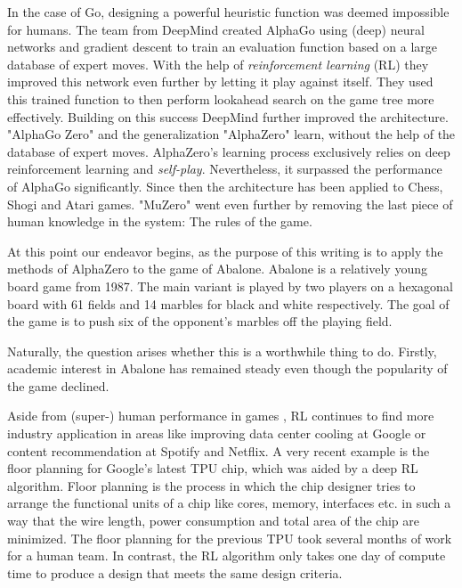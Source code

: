 In the case of Go, designing a powerful heuristic function was deemed impossible for humans. The team from DeepMind created AlphaGo using (deep) neural networks and gradient descent to train an evaluation function based on a large database of expert moves. With the help of \textit{reinforcement learning} (RL) they improved this network even further by letting it play against itself. They used this trained function to then perform lookahead search on the game tree more effectively. \cite{silver_mastering_2017} Building on this success DeepMind further improved the architecture. "AlphaGo Zero" and the generalization "AlphaZero" learn, without the help of the database of expert moves. AlphaZero's learning process exclusively relies on deep reinforcement learning and \textit{self-play}. Nevertheless, it surpassed the performance of AlphaGo significantly. Since then the architecture has been applied to Chess, Shogi and Atari games. "MuZero" went even further by removing the last piece of human knowledge in the system: The rules of the game. \cite{schrittwieser_mastering_2020}

At this point our endeavor begins, as the purpose of this writing is to apply the methods of AlphaZero to the game of Abalone. Abalone is a relatively young board game from 1987. The main variant is played by two players on a hexagonal board with 61 fields and 14 marbles for black and white respectively. The goal of the game is to push six of the opponent's marbles off the playing field.

Naturally, the question arises whether this is a worthwhile thing to do. Firstly, academic interest in Abalone has remained steady even though the popularity of the game declined.

Aside from (super-) human performance in games \cite{mnih_human-level_2015, berner_dota_2019,vinyals_grandmaster_2019}, RL continues to find more industry application in areas like improving data center cooling at Google \cite{gamble_safety-first_2018} or content recommendation at Spotify \cite{jebara_for_2020} and Netflix. \cite{siddiqi_ml_2019}
A very recent example is the floor planning for Google's latest TPU chip, which was aided by a deep RL algorithm. Floor planning is the process in which the chip designer tries to arrange the functional units of a chip like cores, memory, interfaces etc. in such a way that the wire length, power consumption and total area of the chip are minimized. The floor planning for the previous TPU took several months of work for a human team. In contrast, the RL algorithm only takes one day of compute time to produce a design that meets the same design criteria. \cite{mirhoseini_graph_2021}

